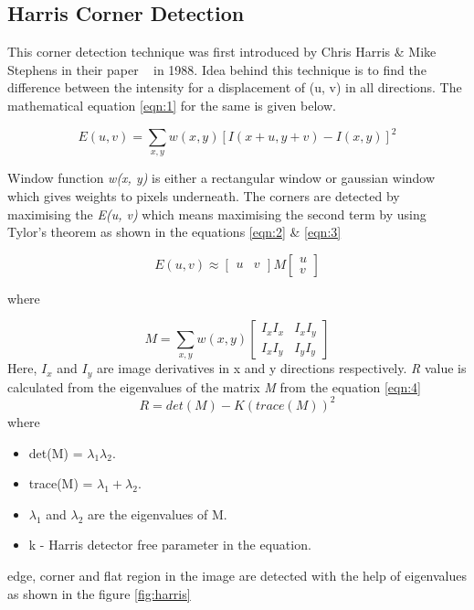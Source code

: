 \subsection{Harris Corner Detection}
 This corner detection technique was first introduced by Chris Harris \& Mike Stephens in their paper ~\cite{harris1988combined} in 1988. Idea behind this technique is to find the difference between the intensity for a displacement of (u, v) in all directions. The mathematical equation \ref{eqn:1} for the same is given below.
 
 \begin{equation}\label{eqn:1}
    E(u, v) = \sum_{x, y} w(x, y) [I(x+u, y+v)-I(x, y)]^{2}
 \end{equation}

Window function \textit{w(x, y)} is either a rectangular window or gaussian window which gives weights to pixels underneath. The corners are detected by maximising the \textit{E(u, v)} which means maximising the second term by using Tylor's theorem as shown in the equations \ref{eqn:2} \& \ref{eqn:3}

 \begin{equation}\label{eqn:2}
    	E(u, v) \approx 
	\begin{bmatrix} 
		u & v
	\end{bmatrix} 
	M
	\begin{bmatrix}
		u\\v 
	\end{bmatrix}
\end{equation}

where

\begin{equation}\label{eqn:3}
	M = \sum_{x,y} w(x, y)
    	\begin{bmatrix}
		I_{x}I_{x} & I_{x}I_{y}
		\\
		I_{x}I_{y} & I_{y}I_{y}
	\end{bmatrix}
\end{equation}
Here, $I_{x}$ and $I_{y}$ are image derivatives in x and y directions respectively.
\textit{R} value is calculated from the eigenvalues of the matrix \textit{M} from the equation \ref{eqn:4}
 \begin{equation}\label{eqn:4}
	R = det(M) - K (trace(M))^{2}
\end{equation}
where
\begin{itemize}
	\item det(M) = $\lambda_{1} \lambda_{2}$.
	\item trace(M) = $\lambda_{1} + \lambda_{2}$.
	\item $\lambda_{1}$ and $\lambda_{2}$ are the eigenvalues of M.
	\item k - Harris detector free parameter in the equation.
\end{itemize}
edge, corner and flat region in the image are detected with the help of eigenvalues as shown in the figure \ref{fig:harris}

